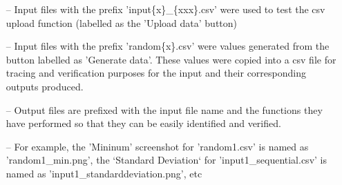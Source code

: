 \begin{enumerate}
    \item[--]Input files with the prefix 'input\{x\}\_\{xxx\}.csv' were used to test the csv upload function (labelled as the 'Upload data' button)
    \item[--]Input files with the prefix 'random\{x\}.csv' were values generated from the button labelled as 'Generate data'. These values were copied into a csv file for tracing and verification purposes for the input and their corresponding outputs produced.
    \item[--]Output files are prefixed with the input file name and the functions they have performed so that they can be easily identified and verified.
    \item[--]For example, the 'Mininum' screenshot for 'random1.csv' is named as 'random1\_min.png', the `Standard Deviation` for 'input1\_sequential.csv' is named as 'input1\_standarddeviation.png', etc
\end{enumerate}


